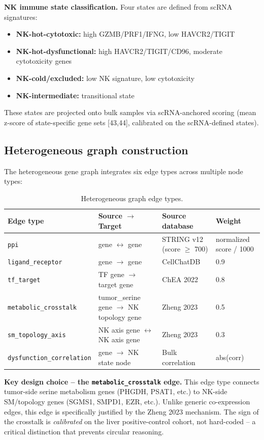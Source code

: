 \documentclass[modern,large,numbered,nocrop]{oup-authoring-template}
\begin{document}
\textbf{NK immune state classification.} Four states are defined from scRNA signatures:

\begin{itemize}
\item \textbf{NK-hot-cytotoxic:} high GZMB/PRF1/IFNG, low HAVCR2/TIGIT
\item \textbf{NK-hot-dysfunctional:} high HAVCR2/TIGIT/CD96, moderate cytotoxicity genes
\item \textbf{NK-cold/excluded:} low NK signature, low cytotoxicity
\item \textbf{NK-intermediate:} transitional state
\end{itemize}

These states are projected onto bulk samples via scRNA-anchored scoring (mean z-score of state-specific gene sets [43,44], calibrated on the scRNA-defined states).

\subsection{Heterogeneous graph construction}

The heterogeneous gene graph integrates six edge types across multiple node types:

\begin{table}[htbp]
\caption{Heterogeneous graph edge types.}
\footnotesize
\begin{tabularx}{\textwidth}{@{}lXXX@{}}
\toprule
Edge type & Source $\to$ Target & Source database & Weight \\
\midrule
\texttt{ppi} & gene $\leftrightarrow$ gene & STRING v12 (score $\geq$ 700) & normalized score / 1000 \\
\texttt{ligand\_receptor} & gene $\to$ gene & CellChatDB & 0.9 \\
\texttt{tf\_target} & TF gene $\to$ target gene & ChEA 2022 & 0.8 \\
\texttt{metabolic\_crosstalk} & tumor\_serine gene $\to$ NK topology gene & Zheng 2023 & 0.5 \\
\texttt{sm\_topology\_axis} & NK axis gene $\leftrightarrow$ NK axis gene & Zheng 2023 & 0.3 \\
\texttt{dysfunction\_correlation} & gene $\to$ NK state node & Bulk correlation & abs(corr) \\
\bottomrule
\end{tabularx}
\end{table}

\textbf{Key design choice -- the \texttt{metabolic\_crosstalk} edge.} This edge type connects tumor-side serine metabolism genes (PHGDH, PSAT1, etc.) to NK-side SM/topology genes (SGMS1, SMPD1, EZR, etc.). Unlike generic co-expression edges, this edge is specifically justified by the Zheng 2023 mechanism. The sign of the crosstalk is \textit{calibrated} on the liver positive-control cohort, not hard-coded -- a critical distinction that prevents circular reasoning.
\end{document}
